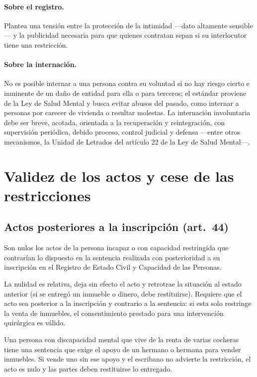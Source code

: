 \documentclass[12pt,oneside]{book}
\begin{document}
\paragraph{Sobre el registro.} Plantea una tensión entre la protección de la intimidad ---dato altamente sensible--- y la publicidad necesaria para que quienes contratan sepan si su interlocutor tiene una restricción.

\paragraph{Sobre la internación.} No es posible internar a una persona contra su voluntad si no hay riesgo cierto e inminente de un daño de entidad para ella o para terceros; el estándar proviene de la Ley de Salud Mental y busca evitar abusos del pasado, como internar a personas por carecer de vivienda o resultar molestas. La internación involuntaria debe ser breve, acotada, orientada a la recuperación y reintegración, con supervisión periódica, debido proceso, control judicial y defensa ---entre otros mecanismos, la Unidad de Letrados del artículo 22 de la Ley de Salud Mental---.

\section{Validez de los actos y cese de las restricciones}

\subsection{Actos posteriores a la inscripción (art.~44)}

\begin{regla}
Son nulos los actos de la persona incapaz o con capacidad restringida que contrarían lo dispuesto en la sentencia realizada con posterioridad a su inscripción en el Registro de Estado Civil y Capacidad de las Personas.
\end{regla}

La nulidad es relativa, deja sin efecto el acto y retrotrae la situación al estado anterior (si se entregó un inmueble o dinero, debe restituirse). Requiere que el acto sea posterior a la inscripción y contrario a la sentencia: si esta solo restringe la venta de inmuebles, el consentimiento prestado para una intervención quirúrgica es válido.

\begin{ejemplo}
Una persona con discapacidad mental que vive de la renta de varias cocheras tiene una sentencia que exige el apoyo de un hermano o hermana para vender inmuebles. Si vende uno sin ese apoyo y el escribano no advierte la restricción, el acto es nulo y las partes deben restituirse lo entregado.
\end{ejemplo}
\end{document}
